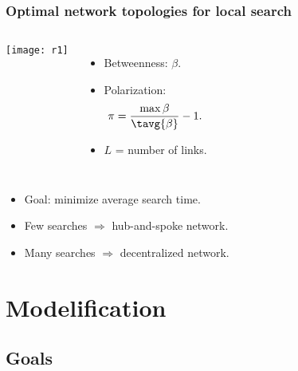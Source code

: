 \begin{frame}
  \frametitle{Optimal network topologies for local search}

  \begin{columns}
    \texttt{[image: r1]}
    \begin{itemize}
    \item<1->
      Betweenness: $\beta$.
    \item<1->
      Polarization: 
      $$\pi = \frac{\max \beta}{\tavg{\beta}}-1.$$
    \item<1->
      $L$ = number of links.
    \end{itemize}
  \end{columns}

  \bigskip


  \begin{itemize}
  \item<1-> 
    Goal: minimize average search time.
  \item<1-> 
    Few searches $\Rightarrow$ hub-and-spoke network.
  \item<1-> 
    Many searches $\Rightarrow$ decentralized network.
  \end{itemize}

\end{frame}


\section{Modelification}

\subsection{Goals}

